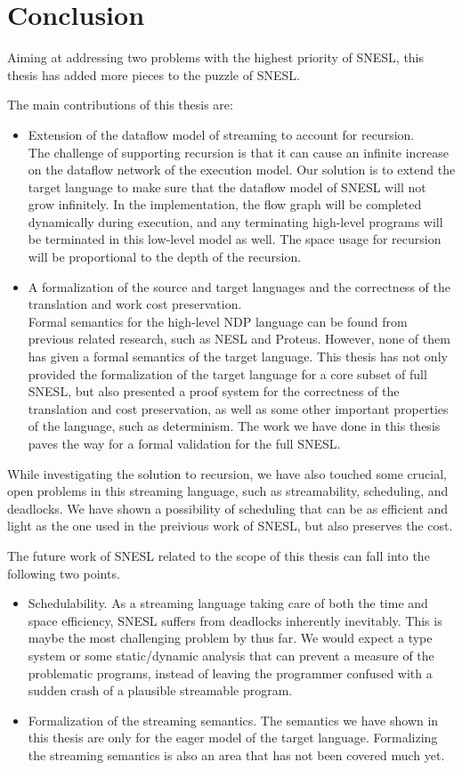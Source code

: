 \chapter{Conclusion}
Aiming at addressing two problems with the highest priority of SNESL, this thesis has added more pieces to the puzzle of SNESL.

The main contributions of this thesis are:
\begin{itemize}
	\item Extension of the dataflow model of streaming to account for recursion. \\
	The challenge of supporting recursion is that it can cause an infinite increase on the dataflow network of the execution model.
	Our solution is to extend the target language to make sure that the dataflow model of SNESL will not grow infinitely. 
	In the implementation, the flow graph will be completed dynamically during execution, and any terminating high-level programs will be terminated in this low-level model as well.
	The space usage for recursion will be proportional to the depth of the recursion. 
\item A formalization of the source and target languages and the correctness of the translation and work cost preservation.  \\
Formal semantics for the high-level NDP language can be found from previous related research, such as NESL and Proteus. However, none of them has given a formal semantics of the target language. 
This thesis has not only provided the formalization of the target language for a core subset of full SNESL, but also presented a proof system for the correctness of the translation and cost preservation, as well as some other important properties of the language, such as determinism.
The work we have done in this thesis paves the way for a formal validation for the full SNESL.
\end{itemize}

While investigating the solution to recursion, we have also touched some crucial, open problems in this streaming language,  such as streamability, scheduling, and deadlocks. 
We have shown a possibility of scheduling that can be as efficient and light as the one used in the preivious work of SNESL, but also preserves the cost.

The future work of SNESL related to the scope of this thesis can fall into the following two points.
\begin{itemize}
	\item Schedulability.  As a streaming language taking care of both the time and space efficiency,  SNESL suffers from deadlocks inherently inevitably. This is maybe the most challenging problem by thus far. We would expect a type system or some static/dynamic analysis that can prevent a measure of the problematic programs, instead of leaving the programmer confused with a sudden crash of a plausible streamable program.
	
	\item Formalization of the streaming semantics. The semantics we have shown in this thesis are only for the eager model of the target language. Formalizing the streaming semantics is also an area that has not been covered much yet.
\end{itemize}
